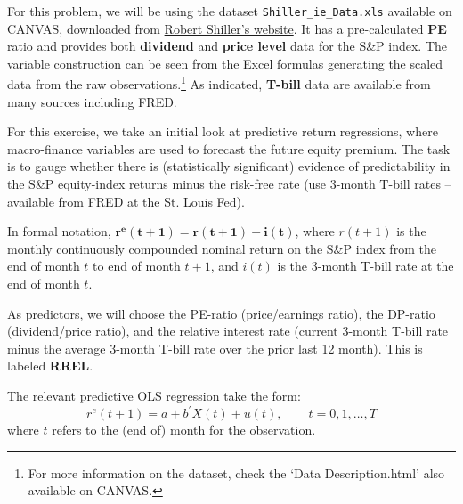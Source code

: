 
For this problem, we will be using the dataset \texttt{Shiller\_ie\_Data.xls} available on CANVAS, downloaded from \href{http://www.econ.yale.edu/~shiller/data.htm}{Robert Shiller's website}. It has a pre-calculated \textbf{PE} ratio and provides both \textbf{dividend} and \textbf{price level} data for the S\&P index. The variable construction can be seen from the Excel formulas generating the scaled data from the raw observations.\footnote{For more information on the dataset, check the `Data Description.html' also available on CANVAS.} As indicated, \textbf{T-bill} data are available from many sources including FRED. \par
For this exercise, we take an initial look at predictive return regressions, where macro-finance variables are used to forecast the future equity premium. The task is to gauge whether there is (statistically significant) evidence of predictability in the S\&P equity-index returns minus the risk-free rate (use 3-month T-bill rates – available from FRED at the St. Louis Fed). \par
In formal notation, \(\mathbf{r^e(t+1)=r(t+1)-i(t)}\), where \(r(t+1)\) is the monthly continuously compounded nominal return on the S\&P index from the end of month \(t\) to end of month \(t+1\), and \(i(t)\) is the 3-month T-bill rate at the end of month \(t\). \par
As predictors, we will choose the PE-ratio (price/earnings ratio), the DP-ratio (dividend/price ratio), and the relative interest rate (current 3-month T-bill rate minus the average 3-month T-bill rate over the prior last 12 month). This is labeled \textbf{RREL}. \par
The relevant predictive OLS regression take the form:
\[
    r^e(t+1) = a + b^\prime X(t) + u(t), \hspace{25pt} t = 0,1,\dots,T
\]
where \(t\) refers to the (end of) month for the observation.

